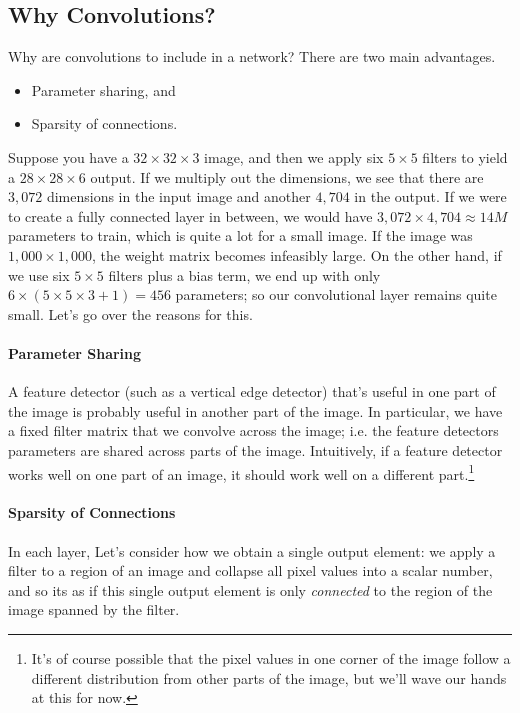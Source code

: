 \documentclass[12pt]{article}
\begin{document}
\subsection{Why Convolutions?} Why are convolutions to include in a network? There are two main advantages.
\begin{itemize} \itemsep0em 
  \item Parameter sharing, and
  \item Sparsity of connections. \end{itemize}

Suppose you have a $32 \times 32 \times 3$ image, and then we apply six $5 \times 5$ filters to yield a $28 \times 28 \times 6$ output. If we multiply out the dimensions, we see that there are $3,072$ dimensions in the input image and another $4,704$ in the output. If we were to create a fully connected layer in between, we would have $3,072 \times 4,704 \approx 14M$ parameters to train, which is quite a lot for a small image. If the image was $1,000 \times 1,000$, the weight matrix becomes infeasibly large. On the other hand, if we use six $5 \times 5$ filters plus a bias term, we end up with only $6 \times (5\times 5 \times 3 + 1) = 456$ parameters; so our convolutional layer remains quite small. Let's go over the reasons for this.

\paragraph{Parameter Sharing} A feature detector (such as a vertical edge detector) that's useful in one part of the image is probably useful in another part of the image. In particular, we have a fixed filter matrix that we convolve across the image; i.e.
the feature detectors parameters are shared across parts of the image. Intuitively, if a feature detector works well
on one part of an image, it should work well on a different part.\footnote{It's of course possible that the pixel values in one corner of the image follow a different distribution from other parts of the image, but we'll wave our hands at this for now.}
\paragraph{Sparsity of Connections} In each layer, Let's consider how we obtain a single output element: we apply a filter to a region of an image and collapse all pixel values into a scalar number, and so its as if this single output element is only 
\emph{connected} to the region of the image spanned by the filter.
\end{document}

